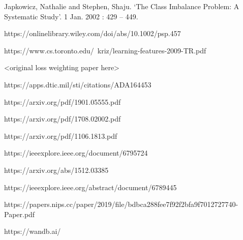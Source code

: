 \documentclass[journal]{IEEEtran}
\begin{document}
\begin{thebibliography}{1}

\bibitem{}
Japkowicz, Nathalie and Stephen, Shaju. ‘The Class Imbalance Problem: A Systematic Study’. 1 Jan. 2002 : 429 – 449. %

\bibitem{}
https://onlinelibrary.wiley.com/doi/abs/10.1002/psp.457 %

\bibitem{}
https://www.cs.toronto.edu/~kriz/learning-features-2009-TR.pdf %

\bibitem{}
<original loss weighting paper here> %

\bibitem{}
https://apps.dtic.mil/sti/citations/ADA164453 %

\bibitem{}
https://arxiv.org/pdf/1901.05555.pdf %

\bibitem{}
https://arxiv.org/pdf/1708.02002.pdf %

\bibitem{}
https://arxiv.org/pdf/1106.1813.pdf %

\bibitem{}
https://ieeexplore.ieee.org/document/6795724 %

\bibitem{}
https://arxiv.org/abs/1512.03385 %

\bibitem{}
https://ieeexplore.ieee.org/abstract/document/6789445 %

\bibitem{}
https://papers.nips.cc/paper/2019/file/bdbca288fee7f92f2bfa9f7012727740-Paper.pdf %

\bibitem{}
https://wandb.ai/ %


\end{thebibliography}
\end{document}
